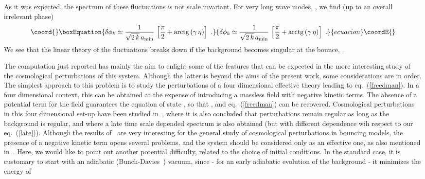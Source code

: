 \documentclass[a4paper,11pt]{article}
\begin{document}
As it was expected, the spectrum of these fluctuations is not scale
invariant. For very long wave modes, \coordHE{}, we find (up to an
overall irrelevant phase)
%
\begin{equation}\coord{}\boxEquation{
\delta \phi_k \simeq \frac{1}{\sqrt{2 \, k}\,a_{\rm min}} \, \left[ \frac{\pi}{2} +
{\rm arctg } \left( \gamma \, \eta \right) \right] \,\,.
\label{late}
}{
\delta \phi_k \simeq \frac{1}{\sqrt{2 \, k}\,a_{\rm min}} \, \left[ \frac{\pi}{2} +
{\rm arctg } \left( \gamma \, \eta \right) \right] \,\,.
}{ecuacion}\coordE{}\end{equation}
%
We see that the linear theory of the fluctuations breaks down if the background becomes singular at the bounce, \coordHE{}.

The computation just reported has mainly the aim to enlight some of the
features that can be expected in the more interesting study of the
cosmological perturbations of this system. Although the latter is beyond
the aims of the present work, some considerations are in order. The
simplest approach to this problem is to study the perturbations of a four
dimensional effective theory leading to eq.~(\ref{freedman}). In a four
dimensional context, this can be obtained at the expense of introducing a
massless field \myHighlight{$\varphi$}\coordHE{} with negative kinetic terms. The absence of a
potential term for the field \myHighlight{$\varphi$}\coordHE{} guarantees the equation of state
\coordHE{}, so that \coordHE{}, and
eq.~(\ref{freedman}) can be recovered. Cosmological perturbations in this
four dimensional set-up have been studied in~\cite{PEPI}, where it is also
concluded that perturbations remain regular as long as the background is
regular, and where a late time scale depended spectrum is also obtained
(but with different \coordHE{} dependence wih respect to our eq.~(\ref{late})).
Although the results of~\cite{PEPI} are very interesting for the general
study of cosmological perturbations in bouncing models, the presence of a
negative kinetic term opens several problems, and the system should be
considered only as an effective one, as also mentioned in~\cite{PEPI}.
Here, we would like to point out another potential difficulty, related to
the choice of initial conditions. In the standard case, it is customary to
start with an adiabatic (Bunch-Davies~\cite{BUDE}) vacuum, since - for an 
early adiabatic evolution of the background - it minimizes the energy of
\end{document}
